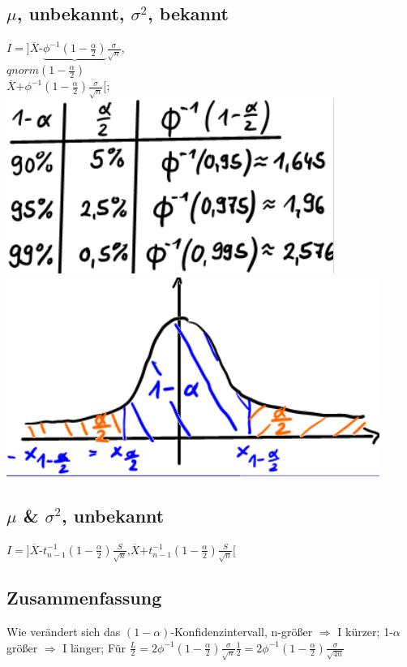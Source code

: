   \subsection{$ \mu $, unbekannt, $ \sigma^{2} $, bekannt}
  $ I = ] \overline{X} \textbf{-} \underbrace{\phi^{-1}( 1-\frac{\alpha}{2} ) } \frac{\sigma}{ \sqrt{n} }\textbf{,} $\\ 
  $ qnorm ( 1-\frac{\alpha}{2} ) $\\
  $ \overline{X} \textbf{+} \phi^{-1} ( 1- \frac{\alpha}{2} ) \frac{\sigma}{ \sqrt{n} } [ $; 
  \includegraphics[scale=0.25]{./pic/QnormTabelle.png}
  \includegraphics[scale=0.25]{./pic/KonfidenzintervallDichtefunktionTabelle.png}

  \subsection{$ \mu $ \& $ \sigma^{2} $, unbekannt }
  $ I = ] \overline{X} \textbf{-} t_{n-1}^{-1} ( 1-\frac{\alpha}{2} ) \frac{S}{ \sqrt{n} } \textbf{,} \overline{X}  \textbf{+} t_{n-1}^{-1} ( 1-\frac{\alpha}{2} )\frac{S}{ \sqrt{n} } [ $
  \subsection{Zusammenfassung}
  Wie verändert sich das $ (1 - \alpha ) $-Konfidenzintervall, n-größer $\Rightarrow$ I kürzer; 1-$ \alpha $ größer $ \Rightarrow $ I länger; 
  Für $ \frac{L}{2} = 2 \phi^{-1}( 1-\frac{ \alpha}{2} ) \frac{\sigma}{ \sqrt{n} } \frac{1}{2} = 2 \phi^{-1} ( 1- \frac{ \alpha }{2} ) \frac{\sigma}{ \sqrt{4n} } $
